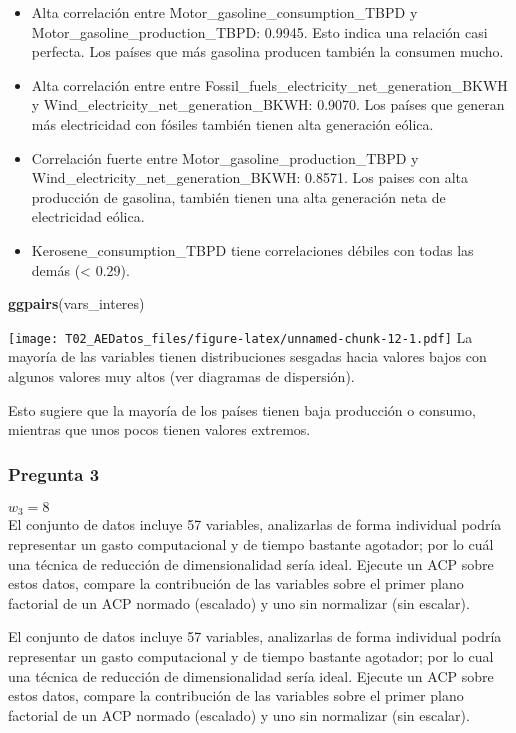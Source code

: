 \documentclass[
]{article}
\newenvironment{Shaded}{\begin{snugshade}}{\end{snugshade}}
\newcommand{\FunctionTok}[1]{\textcolor[rgb]{0.13,0.29,0.53}{\textbf{#1}}}
\newcommand{\NormalTok}[1]{#1}
\begin{document}
\begin{itemize}
\item
  Alta correlación entre Motor\_gasoline\_consumption\_TBPD y
  Motor\_gasoline\_production\_TBPD: 0.9945. Esto indica una relación
  casi perfecta. Los países que más gasolina producen también la
  consumen mucho.
\item
  Alta correlación entre entre
  Fossil\_fuels\_electricity\_net\_generation\_BKWH y
  Wind\_electricity\_net\_generation\_BKWH: 0.9070. Los países que
  generan más electricidad con fósiles también tienen alta generación
  eólica.
\item
  Correlación fuerte entre Motor\_gasoline\_production\_TBPD y
  Wind\_electricity\_net\_generation\_BKWH: 0.8571. Los paises con alta
  producción de gasolina, también tienen una alta generación neta de
  electricidad eólica.
\item
  Kerosene\_consumption\_TBPD tiene correlaciones débiles con todas las
  demás (\textless{} 0.29).
\end{itemize}

\begin{Shaded}
\begin{Highlighting}[]
\FunctionTok{ggpairs}\NormalTok{(vars\_interes)}
\end{Highlighting}
\end{Shaded}

\texttt{[image: T02\_AEDatos\_files/figure-latex/unnamed-chunk-12-1.pdf]}
La mayoría de las variables tienen distribuciones sesgadas hacia valores
bajos con algunos valores muy altos (ver diagramas de dispersión).

Esto sugiere que la mayoría de los países tienen baja producción o
consumo, mientras que unos pocos tienen valores extremos.

\subsubsection{Pregunta 3}\label{pregunta-3}

\(w_3=8\)\\
El conjunto de datos incluye 57 variables, analizarlas de forma
individual podría representar un gasto computacional y de tiempo
bastante agotador; por lo cuál una técnica de reducción de
dimensionalidad sería ideal. Ejecute un ACP sobre estos datos, compare
la contribución de las variables sobre el primer plano factorial de un
ACP normado (escalado) y uno sin normalizar (sin escalar).

El conjunto de datos incluye 57 variables, analizarlas de forma
individual podría representar un gasto computacional y de tiempo
bastante agotador; por lo cual una técnica de reducción de
dimensionalidad sería ideal. Ejecute un ACP sobre estos datos, compare
la contribución de las variables sobre el primer plano factorial de un
ACP normado (escalado) y uno sin normalizar (sin escalar).
\end{document}
